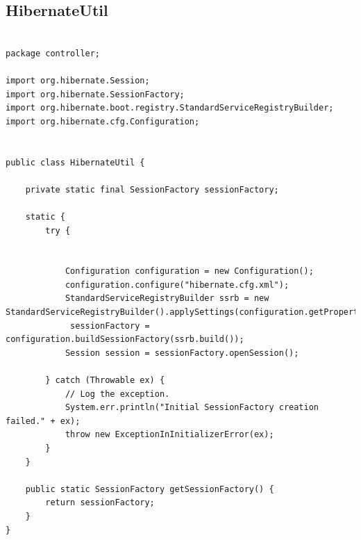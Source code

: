 \documentclass[12pt,a4paper]{article}
\begin{document}
\subsection{HibernateUtil}
\label{subsectionHibernateUtil}
\begin{lstlisting}

package controller;

import org.hibernate.Session;
import org.hibernate.SessionFactory;
import org.hibernate.boot.registry.StandardServiceRegistryBuilder;
import org.hibernate.cfg.Configuration;


public class HibernateUtil {

    private static final SessionFactory sessionFactory;

    static {
        try {
            
            
            Configuration configuration = new Configuration();
            configuration.configure("hibernate.cfg.xml");
            StandardServiceRegistryBuilder ssrb = new StandardServiceRegistryBuilder().applySettings(configuration.getProperties());
             sessionFactory = configuration.buildSessionFactory(ssrb.build());
            Session session = sessionFactory.openSession();

        } catch (Throwable ex) {
            // Log the exception. 
            System.err.println("Initial SessionFactory creation failed." + ex);
            throw new ExceptionInInitializerError(ex);
        }
    }

    public static SessionFactory getSessionFactory() {
        return sessionFactory;
    }
}


\end{lstlisting}
\end{document}
